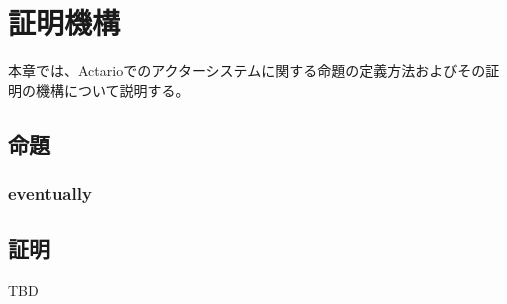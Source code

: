 \chapter{証明機構}

本章では、Actarioでのアクターシステムに関する命題の定義方法およびその証明の機構について説明する。

\section{命題}

\subsection{eventually}

\section{証明}

TBD
